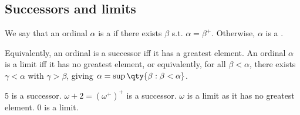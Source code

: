 \subsection{Successors and limits}
\begin{definition}
    We say that an ordinal $\alpha$ is a  if there exists $\beta$ s.t. $\alpha = \beta^+$.
    Otherwise, $\alpha$ is a .
\end{definition}
Equivalently, an ordinal is a successor iff it has a greatest element.
An ordinal $\alpha$ is a limit iff it has no greatest element, or equivalently, for all $\beta < \alpha$, there exists $\gamma < \alpha$ with $\gamma > \beta$, giving $\alpha = \sup \qty{\beta : \beta < \alpha}$.
\begin{example}
    5 is a successor.
    $\omega + 2 = (\omega^+)^+$ is a successor.
    $\omega$ is a limit as it has no greatest element.
    0 is a limit.
\end{example}

